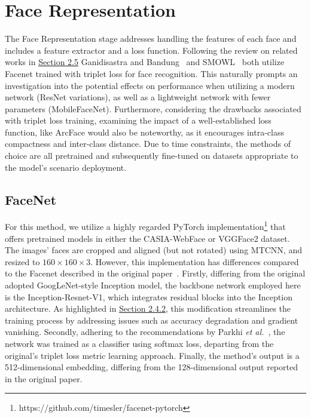\documentclass[class=report, crop=false, a4paper, 12pt]{standalone}
\begin{document}
\section{Face Representation}
The Face Representation stage addresses handling the features of each face and includes a feature extractor and a loss function. Following the review on related works in \hyperref[appendix:related_work]{Section 2.5} Ganidisastra and Bandung~\autocite{ganidisastraIncrementalTrainingDeep2021} and SMOWL~\autocite{labayenOnlineStudentAuthentication2021} both utilize Facenet trained with triplet loss for face recognition. This naturally prompts an investigation into the potential effects on performance when utilizing a modern network (ResNet variations), as well as a lightweight network with fewer parameters (MobileFaceNet). Furthermore, considering the drawbacks associated with triplet loss training, examining the impact of a well-established loss function, like ArcFace would also be noteworthy, as it encourages intra-class compactness and inter-class distance. Due to time constraints, the methods of choice are all pretrained and subsequently fine-tuned on datasets appropriate to the model's scenario deployment.

\subsection{FaceNet}
For this method, we utilize a highly regarded PyTorch implementation\footnote{https://github.com/timesler/facenet-pytorch} that offers pretrained models in either the CASIA-WebFace or VGGFace2 dataset. The images' faces are cropped and aligned (but not rotated) using MTCNN, and resized to $160\times160\times3$. However, this implementation has differences compared to the Facenet described in the original paper~\autocite{schroffFaceNetUnifiedEmbedding2015}. Firstly, differing from the original adopted GoogLeNet-style Inception model, the backbone network employed here is the Inception-Resnet-V1, which integrates residual blocks into the Inception architecture. As highlighted in \hyperref[sec:resnet]{Section 2.4.2}, this modification streamlines the training process by addressing issues such as accuracy degradation and gradient vanishing. Secondly, adhering to the recommendations by Parkhi \textit{et al.}~\autocite{parkhiDeepFaceRecognition2015}, the network was trained as a classifier using softmax loss, departing from the original's triplet loss metric learning approach. Finally, the method's output is a 512-dimensional embedding, differing from the 128-dimensional output reported in the original paper.
\end{document}
